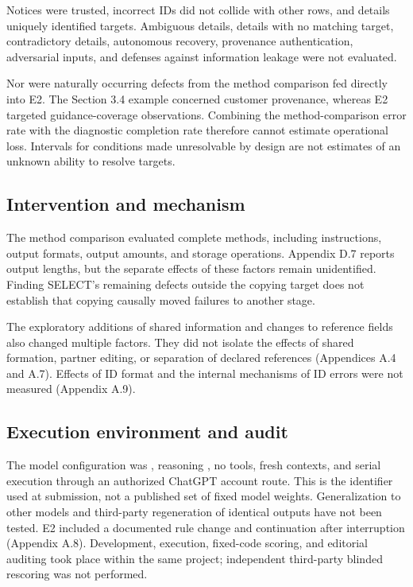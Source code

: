 \documentclass[10pt,a4paper]{article}
\begin{document}
Notices were trusted, incorrect IDs did not collide with other rows, and details uniquely identified targets. Ambiguous details, details with no matching target, contradictory details, autonomous recovery, provenance authentication, adversarial inputs, and defenses against information leakage were not evaluated.

Nor were naturally occurring defects from the method comparison fed directly into E2. The Section 3.4 example concerned customer provenance, whereas E2 targeted guidance-coverage observations. Combining the method-comparison error rate with the diagnostic completion rate therefore cannot estimate operational loss. Intervals for conditions made unresolvable by design are not estimates of an unknown ability to resolve targets.

\subsection{Intervention and mechanism}\label{paper-01-intervention-and-mechanism}

The method comparison evaluated complete methods, including instructions, output formats, output amounts, and storage operations. Appendix D.7 reports output lengths, but the separate effects of these factors remain unidentified. Finding SELECT's remaining defects outside the copying target does not establish that copying causally moved failures to another stage.

The exploratory additions of shared information and changes to reference fields also changed multiple factors. They did not isolate the effects of shared formation, partner editing, or separation of declared references (Appendices A.4 and A.7). Effects of ID format and the internal mechanisms of ID errors were not measured (Appendix A.9).

\subsection{Execution environment and audit}\label{paper-01-execution-environment-and-audit}

The model configuration was \texttt{}, reasoning \texttt{}, no tools, fresh contexts, and serial execution through an authorized ChatGPT account route. This is the identifier used at submission, not a published set of fixed model weights. Generalization to other models and third-party regeneration of identical outputs have not been tested. E2 included a documented rule change and continuation after interruption (Appendix A.8). Development, execution, fixed-code scoring, and editorial auditing took place within the same project; independent third-party blinded rescoring was not performed.
\end{document}
